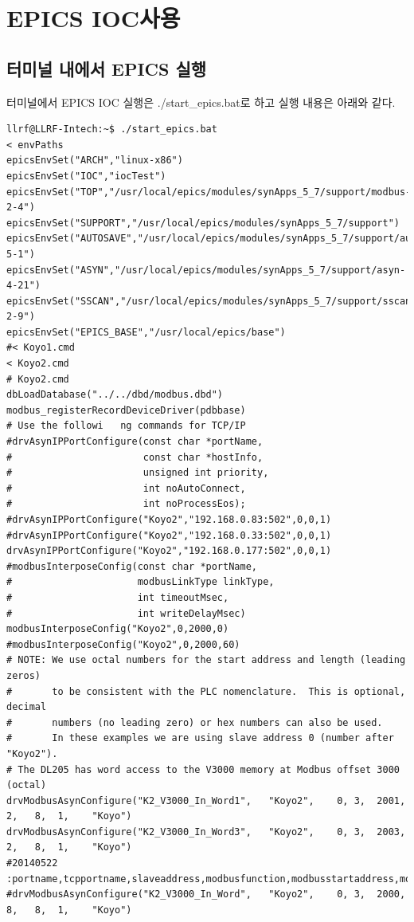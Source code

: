 \documentclass[11pt
  , a4paper
  , article
  , oneside
]{memoir}
\begin{document}
\chapter{EPICS IOC사용}
\section{터미널 내에서 EPICS 실행}
터미널에서 EPICS IOC 실행은 ./start\_epics.bat로 하고 실행 내용은 아래와 같다.
\begin{lstlisting}[style=termstyle]
llrf@LLRF-Intech:~$ ./start_epics.bat 
< envPaths
epicsEnvSet("ARCH","linux-x86")
epicsEnvSet("IOC","iocTest")
epicsEnvSet("TOP","/usr/local/epics/modules/synApps_5_7/support/modbus-2-4")
epicsEnvSet("SUPPORT","/usr/local/epics/modules/synApps_5_7/support")
epicsEnvSet("AUTOSAVE","/usr/local/epics/modules/synApps_5_7/support/autosave-5-1")
epicsEnvSet("ASYN","/usr/local/epics/modules/synApps_5_7/support/asyn-4-21")
epicsEnvSet("SSCAN","/usr/local/epics/modules/synApps_5_7/support/sscan-2-9")
epicsEnvSet("EPICS_BASE","/usr/local/epics/base")
#< Koyo1.cmd
< Koyo2.cmd
# Koyo2.cmd
dbLoadDatabase("../../dbd/modbus.dbd")
modbus_registerRecordDeviceDriver(pdbbase)
# Use the followi	ng commands for TCP/IP
#drvAsynIPPortConfigure(const char *portName,
#                       const char *hostInfo,
#                       unsigned int priority,
#                       int noAutoConnect,
#                       int noProcessEos);
#drvAsynIPPortConfigure("Koyo2","192.168.0.83:502",0,0,1)
#drvAsynIPPortConfigure("Koyo2","192.168.0.33:502",0,0,1)
drvAsynIPPortConfigure("Koyo2","192.168.0.177:502",0,0,1)
#modbusInterposeConfig(const char *portName,
#                      modbusLinkType linkType,
#                      int timeoutMsec, 
#                      int writeDelayMsec)
modbusInterposeConfig("Koyo2",0,2000,0)
#modbusInterposeConfig("Koyo2",0,2000,60)
# NOTE: We use octal numbers for the start address and length (leading zeros)
#       to be consistent with the PLC nomenclature.  This is optional, decimal
#       numbers (no leading zero) or hex numbers can also be used.
#       In these examples we are using slave address 0 (number after "Koyo2").
# The DL205 has word access to the V3000 memory at Modbus offset 3000 (octal)
drvModbusAsynConfigure("K2_V3000_In_Word1",   "Koyo2",    0, 3,  2001,  2,   8,  1,    "Koyo")
drvModbusAsynConfigure("K2_V3000_In_Word3",   "Koyo2",    0, 3,  2003,  2,   8,  1,    "Koyo")
#20140522 :portname,tcpportname,slaveaddress,modbusfunction,modbusstartaddress,modbuslength,datatype,pollmsec,plctype
#drvModbusAsynConfigure("K2_V3000_In_Word",   "Koyo2",    0, 3,  2000,  8,   8,  1,    "Koyo")

\end{lstlisting}
\end{document}
